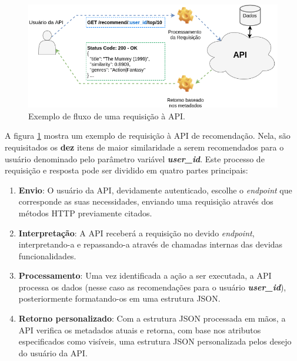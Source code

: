 \begin{figure}[htp]
	\caption{\label{interconnection}Exemplo de fluxo de uma requisição à API.}
	\begin{center}
		\includegraphics[scale=0.62]{images/interconnection.png}
	\end{center}
	\hspace{5.5cm}{Fonte: O Autor.}
\end{figure}

A figura \ref{interconnection} mostra um exemplo de requisição à API de recomendação. Nela, são requisitados os \textbf{dez} itens de maior similaridade a serem recomendados para o usuário denominado pelo parâmetro variável \textbf{\textit{user\_id}}. Este processo de requisição e resposta pode ser dividido em quatro partes principais:

\begin{enumerate}
	\item \textbf{Envio}: O usuário da API, devidamente autenticado, escolhe o \textit{endpoint} que corresponde as suas necessidades, enviando uma requisição através dos métodos HTTP previamente citados.

	\item \textbf{Interpretação}: A API receberá a requisição no devido \textit{endpoint}, interpretando-a e repassando-a através de chamadas internas das devidas funcionalidades.

	\item \textbf{Processamento}: Uma vez identificada a ação a ser executada, a API processa os dados (nesse caso as recomendações para o usuário \textbf{\textit{user\_id}}), posteriormente formatando-os em uma estrutura JSON.

	\item \textbf{Retorno personalizado}: Com a estrutura JSON processada em mãos, a API verifica os metadados atuais e retorna, com base nos atributos especificados como visíveis, uma estrutura JSON personalizada pelos desejo do usuário da API.
\end{enumerate}

